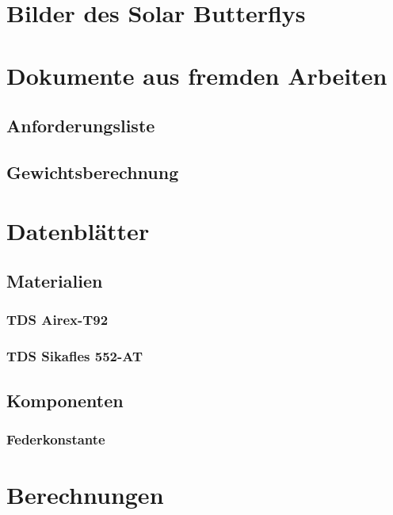 \section{Bilder des Solar Butterflys}
\label{Bilder des Solar Butterflys}



\section{Dokumente aus fremden Arbeiten}
  \subsection{Anforderungsliste}
  \label{e:Anforderungsliste}
  \subsection{Gewichtsberechnung}
  \label{e:Gewichtsberechnung}




\section{Datenblätter}
  \subsection{Materialien}
  \label{e:Materialien}
    \subsubsection{TDS Airex-T92}
    \label{e:Airex}
    \subsubsection{TDS Sikafles 552-AT}
    \label{Sikaflex}

  \subsection{Komponenten}
    \subsubsection{Federkonstante}
    \label{e:Federkonstante}



\section{Berechnungen}
\label{e:Berechnungen}
